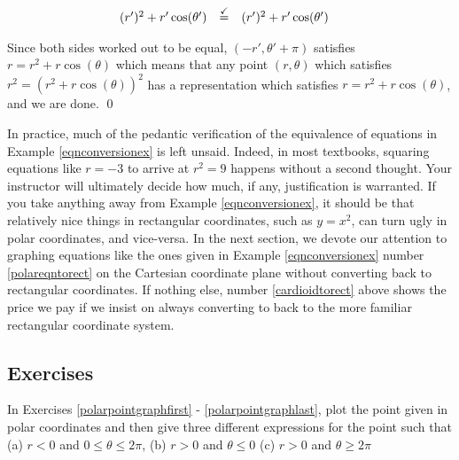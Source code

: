 \begin{ex}
\begin{enumerate}
\begin{enumerate}
\[\begin{array}{rclr}
(r')^2 + r'\cos(\theta') & \stackrel{\text{\checkmark}}{=}  & (r')^2 + r' \cos(\theta') & \\

\end{array} \]

Since both sides worked out to be equal, $(-r', \theta' + \pi)$ satisfies $r = r^2 + r\cos(\theta)$ which means that any point $(r,\theta)$ which satisfies $r^2 = \left(r^2 + r\cos(\theta)\right)^2$ has a representation which satisfies  $r = r^2 + r\cos(\theta)$, and we are done. \qed

\end{enumerate}

\end{enumerate}

\end{ex}

In practice, much of the pedantic verification of the equivalence of equations in Example \ref{eqnconversionex} is left unsaid.  Indeed, in most textbooks, squaring equations like $r=-3$ to arrive at $r^2=9$ happens without a second thought. Your instructor will ultimately decide how much, if any, justification is warranted. If you take anything away from Example \ref{eqnconversionex}, it should be that relatively nice things in rectangular coordinates, such as $y = x^2$, can turn ugly in polar coordinates, and vice-versa.  In the next section, we devote our attention to graphing equations like the ones given in Example \ref{eqnconversionex} number \ref{polareqntorect} on the Cartesian coordinate plane without converting back to rectangular coordinates.  If nothing else, number \ref{cardioidtorect} above shows the price we pay if we insist on always converting to back to the more familiar rectangular coordinate system.

\newpage

\subsection{Exercises}

In Exercises \ref{polarpointgraphfirst} - \ref{polarpointgraphlast}, plot the point given in polar coordinates and then give three different expressions for the point such that \hfill (a) $r < 0$ and $0 \leq \theta \leq 2\pi$, \hfill (b) $r > 0$ and $\theta \leq 0$ \hfill (c) $r > 0$ and $\theta \geq 2\pi$

